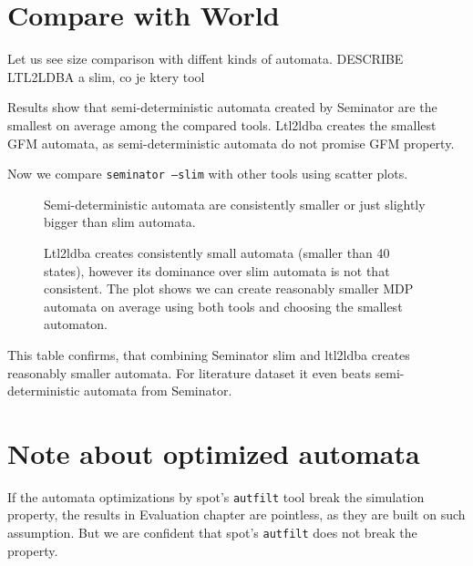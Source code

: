 \documentclass[
	digital
nolof, nolot
]{fithesis3}
\begin{document}
	\clearpage
		\section{Compare with World}
		Let us see size comparison with diffent kinds of automata. DESCRIBE LTL2LDBA a slim, co je ktery tool
		
		\begin{table}[ht]
			\centering
			\caption{Results show that semi-deterministic automata created by Seminator are the smallest on average among the compared tools. Ltl2ldba creates the smallest GFM automata, as semi-deterministic automata do not promise GFM property. }
			
		\end{table}
		
		
		
		Now we compare \texttt{seminator --slim} with other tools using scatter plots.
		\begin{figure}[ht]
			\centering
			\caption{Semi-deterministic automata are consistently smaller or just slightly bigger than slim automata.}
			\begin{tikzpicture}
				
			\end{tikzpicture}
		\end{figure}
		
		
		\begin{figure}[ht]
			\centering
			\caption{Ltl2ldba creates consistently small automata (smaller than 40 states), however its dominance over slim automata is not that consistent. The plot shows we can create reasonably smaller MDP automata on average using both tools and choosing the smallest automaton. }
		\begin{tikzpicture}
		
		\end{tikzpicture}
		\end{figure}
	
	\begin{table}[ht]
		\centering
		\caption{This table confirms, that combining Seminator slim and ltl2ldba creates reasonably smaller automata. For literature dataset it even beats semi-deterministic automata from Seminator.}
		
	\end{table}

		\clearpage
		\section{Note about optimized automata}
		If the automata optimizations by spot's 
		\texttt{autfilt} tool break the simulation property, the results in Evaluation chapter are pointless, as they are built on such assumption. But we are confident that spot's \texttt{autfilt} does not break the property.
\end{document}
